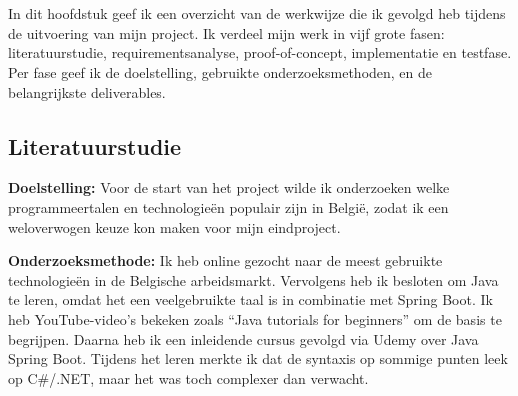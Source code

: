 
\chapter{}
\label{ch:methodologie}


In dit hoofdstuk geef ik een overzicht van de werkwijze die ik gevolgd heb tijdens de uitvoering van mijn project. Ik verdeel mijn werk in vijf grote fasen: literatuurstudie, requirementsanalyse, proof-of-concept, implementatie en testfase. Per fase geef ik de doelstelling, gebruikte onderzoeksmethoden, en de belangrijkste deliverables.

\section{Literatuurstudie}

\textbf{Doelstelling:} Voor de start van het project wilde ik onderzoeken welke programmeertalen en technologieën populair zijn in België, zodat ik een weloverwogen keuze kon maken voor mijn eindproject.

\textbf{Onderzoeksmethode:} Ik heb online gezocht naar de meest gebruikte technologieën in de Belgische arbeidsmarkt. Vervolgens heb ik besloten om Java te leren, omdat het een veelgebruikte taal is in combinatie met Spring Boot. Ik heb YouTube-video’s bekeken zoals “Java tutorials for beginners” om de basis te begrijpen. Daarna heb ik een inleidende cursus gevolgd via Udemy over Java Spring Boot. Tijdens het leren merkte ik dat de syntaxis op sommige punten leek op C\#/.NET, maar het was toch complexer dan verwacht.

